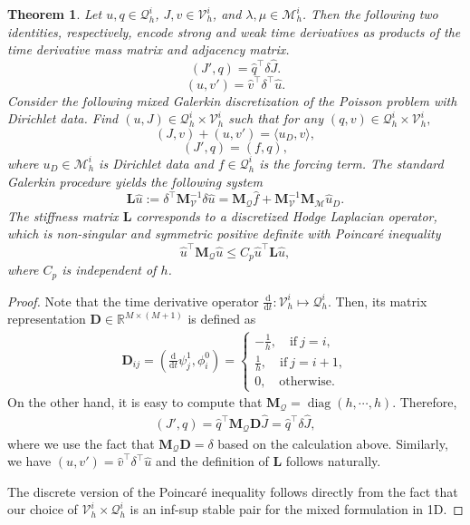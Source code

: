 \documentclass[10pt,a4paper]{amsart}
\newtheorem{theorem}{Theorem}
\begin{document}
\begin{theorem}\label{thm:hodgetheory}
    Let $u,q \in \mathcal{Q}_h^i$, $J,v \in \mathcal{V}_h^i$, and $\lambda,\mu \in \mathcal{M}_h^i$. Then the following two identities, respectively, encode \textit{strong} and \textit{weak} time derivatives as products of the time derivative mass matrix and adjacency matrix.
    $$({J}',q) = \hat{q}^\intercal  \delta \hat{J}.$$
    $$(u,{v}') = \hat{v}^\intercal \delta^\intercal \hat{u}.$$
    Consider the following mixed Galerkin discretization of the Poisson problem with Dirichlet data. Find $(u,J) \in \mathcal{Q}_h^i\times \mathcal{V}_h^i$ such that for any $(q,v) \in \mathcal{Q}_h^i\times \mathcal{V}_h^i,$
    $$ (J,v) + (u,v') = \langle u_D,v \rangle, $$
    $$ (J',q) = (f,q),$$
    where $u_D \in \mathcal{M}_h^i$ is Dirichlet data and $f \in \mathcal{Q}_h^i$ is the forcing term. The standard Galerkin procedure yields the following system
    $$\mathbf{L} \hat{u} :=   \delta^\intercal \mathbf{M}_{\mathcal{V}}^{-1}\delta\hat{u} = \mathbf{M}_{\mathcal{Q}}\hat{f} + \mathbf{M}_\mathcal{V}^{-1}\mathbf{M}_\mathcal{M} \hat{u}_D.
 $$
    The stiffness matrix $\mathbf{L}$ corresponds to a discretized Hodge Laplacian operator, which is non-singular and symmetric positive definite with Poincar\'e inequality 
    $$\hat{u}^\intercal \mathbf{M}_{\mathcal{Q}} \hat{u} \leq C_p \hat{u}^\intercal \mathbf{L} \hat{u}, 
    $$ 
    where $C_p$ is independent of $h$.
\end{theorem}

\begin{proof}
Note that the time derivative operator $\frac{\mathrm{d}}{\mathrm{d}t} : \mathcal{V}_h^i \mapsto \mathcal{Q}_h^i$.  Then, its matrix representation $\mathbf{D} \in \mathbb{R}^{M \times (M+1)}$ is defined as 
\begin{align*}
\mathbf{D}_{ij} = (\frac{\mathrm{d}}{\mathrm{d}t}\psi_j^1, \phi_i^0) = 
\begin{cases}
-\frac{1}{h}, \quad  \text{if} \ j = i,  \\
\frac{1}{h}, \quad  \text{if} \ j=i+1, \\
0, \quad \text{otherwise.}
\end{cases}
\end{align*}
On the other hand, it is easy to compute that $\mathbf{M}_{\mathcal{Q}} = \operatorname{diag}(h, \cdots, h)$. Therefore, 
\begin{align*}
	(J', q) = \hat{q}^{\intercal} \mathbf{M}_{\mathcal{Q}} \mathbf{D} \hat{J} = \hat{q}^{\intercal} \delta \hat{J},
\end{align*} 
where we use the fact that $\mathbf{M}_{\mathcal{Q}} \mathbf{D} = \delta$ based on the calculation above.  Similarly, we have $(u, v') = \hat{v}^{\intercal}\delta^{\intercal} \hat{u}$ and the definition of $\mathbf{L}$ follows naturally.  

The discrete version of the Poincar\'e inequality follows directly from the fact that our choice of $\mathcal{V}_h^i \times \mathcal{Q}_h^i$ is an inf-sup stable pair for the mixed formulation in 1D. 
\end{proof}
\end{document}
